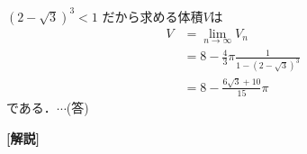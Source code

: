 \documentclass[a4paper,10pt]{ltjsarticle}
\begin{document}
\begin{multicols}{2}
    $(2-\sqrt{3})^3 < 1$ だから求める体積$V$は
    \begin{align*}
        V & = \lim_{n \to \infty} V_n                       \\
          & = 8 - \frac{4}{3}\pi \frac{1}{1-(2-\sqrt{3})^3} \\
          & = 8 - \frac{6\sqrt{3}+10}{15}\pi
    \end{align*}
    である．$\cdots$(答)

    {\bf[解説]}

    \newpage
\end{multicols}
\end{document}
